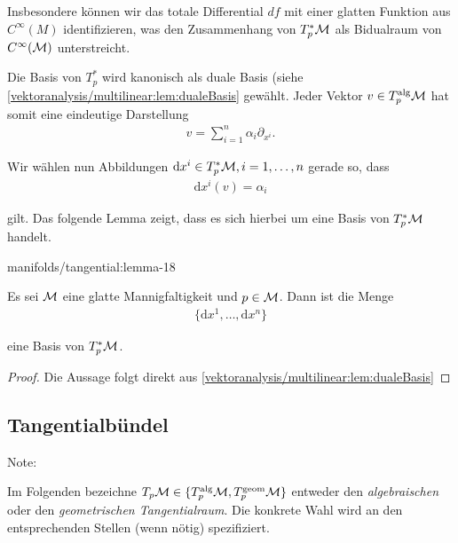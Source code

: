 \par
Insbesondere können wir das totale Differential \(df\) mit einer glatten Funktion aus \(C^\infty(M)\) identifizieren, was den Zusammenhang von \(T^\ast_p \mathcal{M}\) als Bidualraum von \(C^\infty(\mathcal{M})\) unterstreicht.

\par
Die Basis von \(T^\ast_p\) wird kanonisch als duale Basis (siehe \cref{vektoranalysis/multilinear:lem:dualeBasis}  gewählt.
Jeder Vektor \(v\in T_p^{\text{alg}}\mathcal{M}\) hat somit eine eindeutige Darstellung
\begin{align*}
v = \sum_{i=1}^n \alpha_i \partial_{x^i}.
\end{align*}
\par
Wir wählen nun Abbildungen \(\mathrm{d}x^i\in T^\ast_p\mathcal{M}, i=1,\ldots,n\) gerade so, dass
\begin{align*}
\mathrm{d}x^i(v) = \alpha_i
\end{align*}
\par
gilt.
Das folgende Lemma zeigt, dass es sich hierbei um eine Basis von \(T^\ast_p\mathcal{M}\) handelt.
\begin{lemma}{}{manifolds/tangential:lemma-18}



\par
Es sei \(\mathcal{M}\) eine glatte Mannigfaltigkeit und \(p\in\mathcal{M}\).
Dann ist die Menge
\begin{align*}
\{\mathrm{d}x^1,\ldots, \mathrm{d}x^n\}
\end{align*}
\par
eine Basis von \(T_p^\ast\mathcal{M}\).
\end{lemma}

\begin{proof}
 Die Aussage folgt direkt aus \cref{vektoranalysis/multilinear:lem:dualeBasis} 
\end{proof}


\subsection{Tangentialbündel}
\label{\detokenize{manifolds/tangential:tangentialbundel}}
\begin{emphBox}{}{}{Note:}
\par
Im Folgenden bezeichne \(T_p\mathcal{M}\in\{T^{\text{alg}}_p\mathcal{M}, T^{\text{geom}}_p\mathcal{M} \}\) entweder den \emph{algebraischen} oder den \emph{geometrischen Tangentialraum}.
Die konkrete Wahl wird an den entsprechenden Stellen (wenn nötig) spezifiziert.
\end{emphBox}

